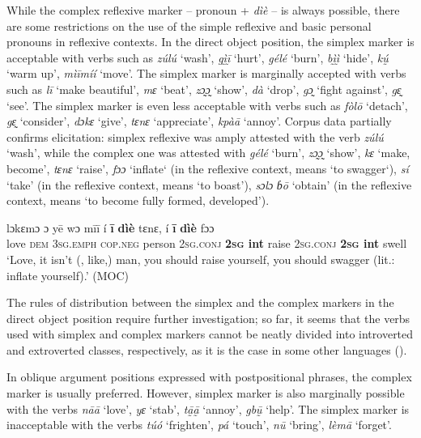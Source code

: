\documentclass[output=paper]{langscibook}
\begin{document}
While the complex reflexive marker – pronoun + \textit{dìè} – is always possible, there are some restrictions on the use of the simple reflexive and basic personal pronouns in reflexive contexts. In the direct object position, the simplex marker is acceptable with verbs such as \textit{zúlú} ‘wash’, \textit{gḭ̀ḭ̄} ‘hurt’, \textit{gélé} ‘burn’, \textit{bḭ̀ḭ̀} ‘hide’, \textit{kṵ́} ‘warm up’, \textit{mìīmíí} ‘move’. The simplex marker is marginally accepted with verbs such as \textit{lī} ‘make beautiful’, \textit{mɛ} ‘beat’, \textit{zɔ̰ɔ̰} ‘show’, \textit{dà} ‘drop’, \textit{gɔ̰} ‘fight against’, \textit{gɛ̰} ‘see’. The simplex marker is even less acceptable with verbs such as \textit{fòlō} ‘detach’, \textit{gɛ̰} ‘consider’, \textit{dɔkɛ} ‘give’, \textit{tɛnɛ} ‘appreciate’, \textit{kpàā} ‘annoy’. Corpus data partially confirms elicitation: simplex reflexive was amply attested with the verb \textit{zúlú} ‘wash’, while the complex one was attested with \textit{gélé} ‘burn’, \textit{zɔ̰ɔ̰} ‘show’, \textit{kɛ} ‘make, become’, \textit{tɛnɛ} ‘raise’, \textit{fɔɔ} ‘inflate‘ (in the reflexive context, means ‘to swagger‘), \textit{sí} ‘take’ (in the reflexive context, means ‘to boast’), \textit{sɔlɔ} \textit{ɓō} ‘obtain’ (in the reflexive context, means ‘to become fully formed, developed’). 

\ea
    \label{ex:Kachaturyan:11} 
 \gll lɔkɛmɔ  ɔ  yē  wɔ  mīī  í  \textbf{ī}  \textbf{dìè}  tɛnɛ,  í  \textbf{ī}  \textbf{dìè}  fɔɔ\\
     love  \textsc{dem}  \textsc{3sg.emph}  \textsc{cop.neg}  person  \textsc{2sg.conj}  \textbf{\textsc{2sg}  \textbf{int}}  raise  \textsc{2sg.conj}  \textbf{\textsc{2sg}  \textbf{int}}  swell\\
\glt ‘Love, it isn’t (, like,) man, you should raise yourself, you should swagger (lit.: inflate yourself).’ (MOC)
\z

The rules of distribution between the simplex and the complex markers in the direct object position require further investigation; so far, it seems that the verbs used with simplex and complex markers cannot be neatly divided into introverted and extroverted classes, respectively, as it is the case in some other languages (\citealt{KoenigVezzosi2004}). 

In oblique argument positions expressed with postpositional phrases, the complex marker is usually preferred. However, simplex marker is also marginally possible with the verbs \textit{nāā} ‘love’, \textit{yɛ} ‘stab’, \textit{tā̰ā̰} ‘annoy’, \textit{gbṵ̄} ‘help’. The simplex marker is inacceptable with the verbs \textit{túó} ‘frighten’, \textit{pá} ‘touch’, \textit{nū} ‘bring’, \textit{lèmā} ‘forget’. 
\end{document}
